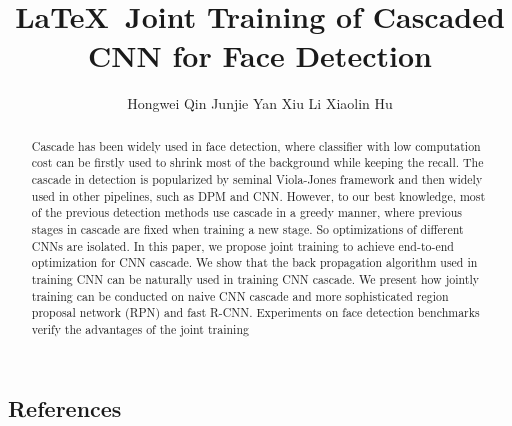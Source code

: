 \documentclass[10pt,twocolumn,letterpaper]{article}
\begin{document}
\title{\LaTeX\ Joint Training of Cascaded CNN for Face Detection}
\iffalse
\author{First Author\\
Institution1\\
Institution1 address\\
{\tt\small firstauthor@i1.org}
\and
Second Author\\
Institution2\\
First line of institution2 address\\
{\tt\small secondauthor@i2.org}
}
\fi

\author {Hongwei Qin   Junjie Yan   Xiu Li   Xiaolin Hu}


\maketitle

\begin{abstract}
   Cascade has been widely used in face detection, where
classifier with low computation cost can be firstly used to
shrink most of the background while keeping the recall. The
cascade in detection is popularized by seminal Viola-Jones
framework and then widely used in other pipelines, such
as DPM and CNN. However, to our best knowledge, most
of the previous detection methods use cascade in a greedy
manner, where previous stages in cascade are fixed when
training a new stage. So optimizations of different CNNs are
isolated. In this paper, we propose joint training to achieve
end-to-end optimization for CNN cascade. We show that
the back propagation algorithm used in training CNN can
be naturally used in training CNN cascade. We present how
jointly training can be conducted on naive CNN cascade
and more sophisticated region proposal network (RPN) and
fast R-CNN. Experiments on face detection benchmarks verify the advantages of the joint training
\end{abstract}





\iffalse

\subsection{References}
\end{document}
